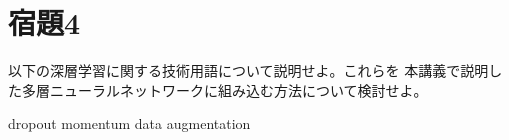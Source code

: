 \documentclass[class=jsarticle, crop=false, dvipdfmx, fleqn]{standalone}
\begin{document}
\section*{宿題4}


以下の深層学習に関する技術用語について説明せよ。これらを
本講義で説明した多層ニューラルネットワークに組み込む方法について検討せよ。

dropout
momentum
data augmentation
\end{document}

